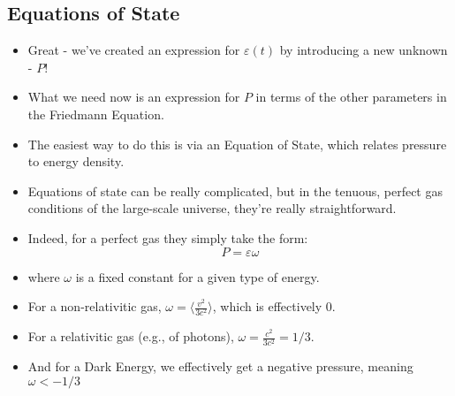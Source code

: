 \documentclass[11pt]{article}
\begin{document}
\subsection{Equations of State}
\begin{itemize}
\item Great - we've created an expression for $\varepsilon(t)$ by introducing a new unknown - $P$!
\item What we need now is an expression for $P$ in terms of the other parameters in the Friedmann Equation.
\item The easiest way to do this is via an Equation of State, which relates pressure to energy density.
\item Equations of state can be really complicated, but in the tenuous, perfect gas conditions of the large-scale universe, they're really straightforward.
\item Indeed, for a perfect gas they simply take the form:
\begin{equation}
P = \varepsilon\omega
\end{equation}
\item where $\omega$ is a fixed constant for a given type of energy.
\item For a non-relativitic gas, $\omega = \langle\frac{v^2}{3c^2}\rangle$, which is effectively 0.
\item For a relativitic gas (e.g., of photons), $\omega = \frac{c^2}{3c^2} = 1/3$.
\item And for a Dark Energy, we effectively get a negative pressure, meaning $\omega<-1/3$

\end{itemize}
    
\end{document}
